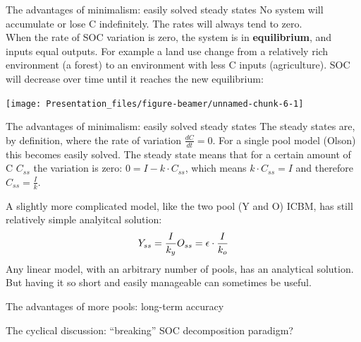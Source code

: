 \documentclass[
  ignorenonframetext,
]{beamer}
\begin{document}
\begin{frame}{The advantages of minimalism: easily solved steady states}
\protect\hypertarget{the-advantages-of-minimalism-easily-solved-steady-states}{}
No system will accumulate or lose C indefinitely. The rates will always
tend to zero.\\
When the rate of SOC variation is zero, the system is in
\textbf{equilibrium}, and inputs equal outputs. For example a land use
change from a relatively rich environment (a forest) to an environment
with less C inputs (agriculture). SOC will decrease over time until it
reaches the new equilibrium:

\texttt{[image: Presentation\_files/figure-beamer/unnamed-chunk-6-1]}
\end{frame}

\begin{frame}{The advantages of minimalism: easily solved steady states}
\protect\hypertarget{the-advantages-of-minimalism-easily-solved-steady-states-1}{}
The steady states are, by definition, where the rate of variation
\(\frac{dC}{dt}=0\). For a single pool model (Olson) this becomes easily
solved. The steady state means that for a certain amount of C \(C_{ss}\)
the variation is zero: \(0 = I - k \cdot C_{ss}\), which means
\(k \cdot C_{ss} = I\) and therefore \(C_{ss}=\frac{I}{k}\).

A slightly more complicated model, like the two pool (Y and O) ICBM, has
still relatively simple analyitcal solution: \[
Y_{ss}=\frac{I}{k_y}\\
O_{ss}=\epsilon\cdot\frac{I}{k_o}
\] Any linear model, with an arbitrary number of pools, has an
analytical solution. But having it so short and easily manageable can
sometimes be useful.
\end{frame}

\begin{frame}{The advantages of more pools: long-term accuracy}
\protect\hypertarget{the-advantages-of-more-pools-long-term-accuracy}{}
\end{frame}

\begin{frame}{The cyclical discussion: ``breaking'' SOC decomposition
paradigm?}
\protect\hypertarget{the-cyclical-discussion-breaking-soc-decomposition-paradigm}{}
\end{frame}
\end{document}
